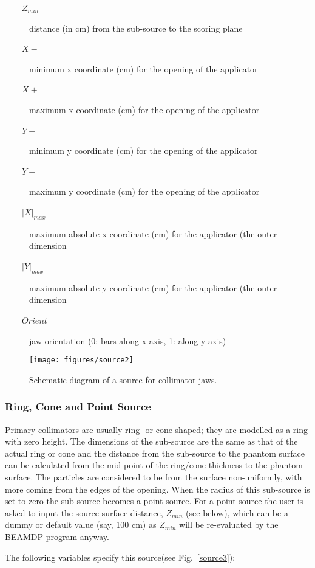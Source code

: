 \documentclass[12pt,twoside]{article}
\begin{document}
\begin{description}
\item [~~~~$Z_{min}$] distance (in cm) from the sub-source to the scoring plane
\item [~~~~$X-$] minimum x coordinate (cm) for the opening of the applicator
\item [~~~~$X+$] maximum x coordinate (cm) for the opening of the applicator
\item [~~~~$Y-$] minimum y coordinate (cm) for the opening of the applicator
\item [~~~~$Y+$] maximum y coordinate (cm) for the opening of the applicator
\item [~~~~$|X|_{max}$] maximum absolute x coordinate (cm) for the applicator (the outer dimension
\item [~~~~$|Y|_{max}$] maximum absolute y coordinate (cm) for the applicator (the outer dimension
\item [~~~~$Orient$] jaw orientation (0: bars along x-axis, 1: along y-axis)
\end{description}
\begin{figure}[htbp]
\begin{center}
\leavevmode
\mbox{}\hspace{0cm}
\texttt{[image: figures/source2]}
\caption[]
{Schematic diagram of a source for collimator jaws. }
\label{source2}
\end{center}
\end{figure}
\subsubsection{Ring, Cone and Point Source}
Primary collimators are usually ring- or cone-shaped; they are modelled as a ring with zero height. The dimensions of the sub-source are the same as that of the actual ring or cone and the distance from the sub-source to the phantom surface can be calculated from the mid-point of the ring/cone thickness to the phantom surface. The particles are considered to be from the surface non-uniformly, with more coming from the edges of the opening.
When the radius of this sub-source is set to zero the sub-source becomes a point source. For a point source the user is asked to input the source surface distance, $Z_{min}$ (see below), which can be a dummy or default value (say, 100 cm) as $Z_{min}$ will be re-evaluated by the BEAMDP program anyway.

The following variables specify this source(see Fig.~\ref{source3}):
\end{document}
